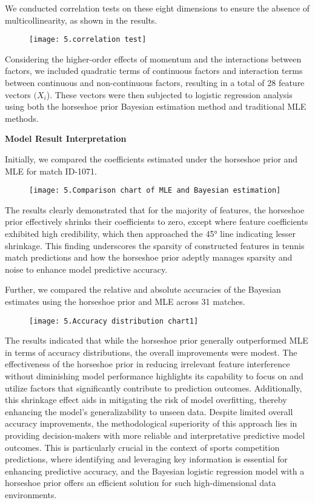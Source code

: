 \documentclass{mcmthesis}
\begin{document}
We conducted correlation tests on these eight dimensions to ensure the absence of multicollinearity, as shown in the results.

\begin{figure}[ht]%
  \small
  \centering
  \texttt{[image: 5.correlation test]}
\end{figure}

Considering the higher-order effects of momentum and the interactions between factors, we included quadratic terms of continuous factors and interaction terms between continuous and non-continuous factors, resulting in a total of 28 feature vectors $(X_i$). These vectors were then subjected to logistic regression analysis using both the horseshoe prior Bayesian estimation method and traditional MLE methods.

\textbf{Model Result Interpretation}

Initially, we compared the coefficients estimated under the horseshoe prior and MLE for match ID-1071. 

\begin{figure}[ht]
  \small
  \centering
  \texttt{[image: 5.Comparison chart of MLE and Bayesian estimation]}
\end{figure}

The results clearly demonstrated that for the majority of features, the horseshoe prior effectively shrinks their coefficients to zero, except where feature coefficients exhibited high credibility, which then approached the 45° line indicating lesser shrinkage. This finding underscores the sparsity of constructed features in tennis match predictions and how the horseshoe prior adeptly manages sparsity and noise to enhance model predictive accuracy.

Further, we compared the relative and absolute accuracies of the Bayesian estimates using the horseshoe prior and MLE across 31 matches.

\begin{figure}[ht]
  \centering
  \texttt{[image: 5.Accuracy distribution chart1]}
\end{figure}

The results indicated that while the horseshoe prior generally outperformed MLE in terms of accuracy distributions, the overall improvements were modest. The effectiveness of the horseshoe prior in reducing irrelevant feature interference without diminishing model performance highlights its capability to focus on and utilize factors that significantly contribute to prediction outcomes. Additionally, this shrinkage effect aids in mitigating the risk of model overfitting, thereby enhancing the model's generalizability to unseen data. Despite limited overall accuracy improvements, the methodological superiority of this approach lies in providing decision-makers with more reliable and interpretative predictive model outcomes. This is particularly crucial in the context of sports competition predictions, where identifying and leveraging key information is essential for enhancing predictive accuracy, and the Bayesian logistic regression model with a horseshoe prior offers an efficient solution for such high-dimensional data environments.
\end{document}
